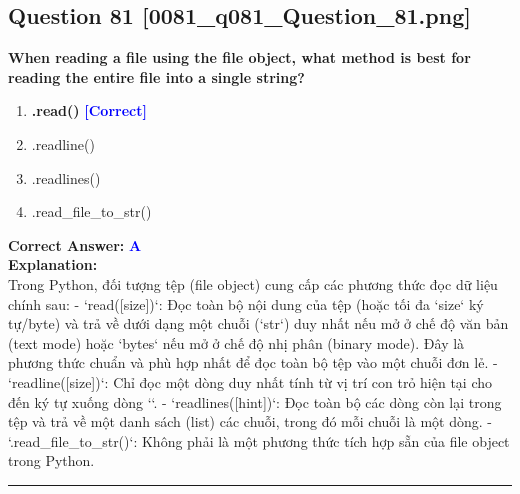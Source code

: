 \documentclass[11pt,a4paper]{article}
\begin{document}
\begin{minipage}{\textwidth}
\subsection*{Question 81 \quad \footnotesize{[0081_q081_Question_81.png]}}
\noindent \textbf{When reading a file using the file object, what method is best for reading the entire file into a single string?}

\begin{enumerate}[label=\Alph*.]
    \item \textbf{.read()} \hfill \textcolor{blue}{\textbf{[Correct]}}
    \item .readline()
    \item .readlines()
    \item .read_file_to_str()
\end{enumerate}

\noindent \textbf{Correct Answer:} \textcolor{blue}{\textbf{A}} \\[4pt]
\noindent \textbf{Explanation:}\\
Trong Python, đối tượng tệp (file object) cung cấp các phương thức đọc dữ liệu chính sau:\newline
- `read([size])`: Đọc toàn bộ nội dung của tệp (hoặc tối đa `size` ký tự/byte) và trả về dưới dạng một chuỗi (`str`) duy nhất nếu mở ở chế độ văn bản (text mode) hoặc `bytes` nếu mở ở chế độ nhị phân (binary mode). Đây là phương thức chuẩn và phù hợp nhất để đọc toàn bộ tệp vào một chuỗi đơn lẻ.\newline
- `readline([size])`: Chỉ đọc một dòng duy nhất tính từ vị trí con trỏ hiện tại cho đến ký tự xuống dòng `\n`.\newline
- `readlines([hint])`: Đọc toàn bộ các dòng còn lại trong tệp và trả về một danh sách (list) các chuỗi, trong đó mỗi chuỗi là một dòng.\newline
- `.read_file_to_str()`: Không phải là một phương thức tích hợp sẵn của file object trong Python.
\end{minipage}
\vspace{0.8cm}
\hrule
\vspace{0.5cm}
\end{document}
